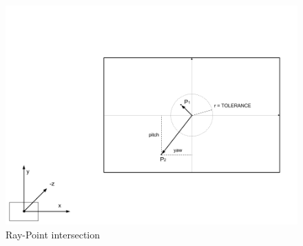 \begin{figure}[H]
	\caption{Ray-Point intersection}
	\label{fig:ray-point-intersection}
	\centering
	\includegraphics[width=\textwidth, keepaspectratio]{Figures/ray-point-intersection.png}
	\decoRule
\end{figure}

